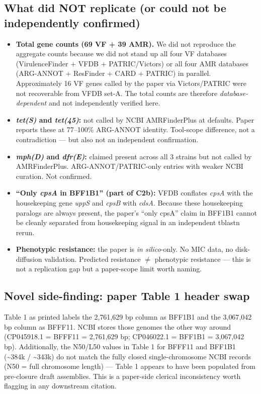 \documentclass[11pt]{article}
\begin{document}
\subsection{What did NOT replicate (or could not be independently confirmed)}
\begin{itemize}
  \item \textbf{Total gene counts (69 VF + 39 AMR).} We did not reproduce the aggregate counts because we did not stand up all four VF databases (VirulenceFinder + VFDB + PATRIC/Victors) or all four AMR databases (ARG-ANNOT + ResFinder + CARD + PATRIC) in parallel. Approximately 16 VF genes called by the paper via Victors/PATRIC were not recoverable from VFDB set-A. The total counts are therefore \emph{database-dependent} and not independently verified here.
  \item \textbf{\emph{tet(S)} and \emph{tet(45)}:} not called by NCBI AMRFinderPlus at defaults. Paper reports these at 77--100\% ARG-ANNOT identity. Tool-scope difference, not a contradiction --- but also not an independent confirmation.
  \item \textbf{\emph{mph(D)} and \emph{dfr(E)}:} claimed present across all 3 strains but not called by AMRFinderPlus. ARG-ANNOT/PATRIC-only entries with weaker NCBI curation. Not confirmed.
  \item \textbf{``Only \emph{cpsA} in BFF1B1'' (part of C2b):} VFDB conflates \emph{cpsA} with the housekeeping gene \emph{uppS} and \emph{cpsB} with \emph{cdsA}. Because these housekeeping paralogs are always present, the paper's ``only cpsA'' claim in BFF1B1 cannot be cleanly separated from housekeeping signal in an independent tblastn rerun.
  \item \textbf{Phenotypic resistance:} the paper is \emph{in silico}-only. No MIC data, no disk-diffusion validation. Predicted resistance $\ne$ phenotypic resistance --- this is not a replication gap but a paper-scope limit worth naming.
\end{itemize}

\subsection{Novel side-finding: paper Table 1 header swap}
Table 1 as printed labels the 2{,}761{,}629 bp column as BFF1B1 and the 3{,}067{,}042 bp column as BFFF11. NCBI stores those genomes the other way around (CP045918.1 = BFFF11 = 2{,}761{,}629 bp; CP046022.1 = BFF1B1 = 3{,}067{,}042 bp). Additionally, the N50/L50 values in Table 1 for BFFF11 and BFF1B1 (\textasciitilde384k / \textasciitilde343k) do not match the fully closed single-chromosome NCBI records (N50 = full chromosome length) --- Table 1 appears to have been populated from pre-closure draft assemblies. This is a paper-side clerical inconsistency worth flagging in any downstream citation.
\end{document}
